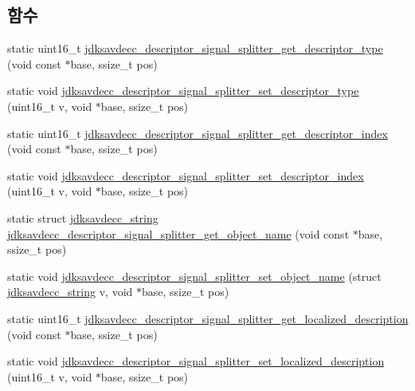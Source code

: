 \subsection*{함수}
\begin{DoxyCompactItemize}
\item 
static uint16\+\_\+t \hyperlink{group__descriptor__signal__splitter_ga2d820535595d7a1730629dc8cfe72a04}{jdksavdecc\+\_\+descriptor\+\_\+signal\+\_\+splitter\+\_\+get\+\_\+descriptor\+\_\+type} (void const $\ast$base, ssize\+\_\+t pos)
\item 
static void \hyperlink{group__descriptor__signal__splitter_ga26384b0bdf1407ece585e287f97437a7}{jdksavdecc\+\_\+descriptor\+\_\+signal\+\_\+splitter\+\_\+set\+\_\+descriptor\+\_\+type} (uint16\+\_\+t v, void $\ast$base, ssize\+\_\+t pos)
\item 
static uint16\+\_\+t \hyperlink{group__descriptor__signal__splitter_ga4fe9ee5536c672b456535486c30be9fa}{jdksavdecc\+\_\+descriptor\+\_\+signal\+\_\+splitter\+\_\+get\+\_\+descriptor\+\_\+index} (void const $\ast$base, ssize\+\_\+t pos)
\item 
static void \hyperlink{group__descriptor__signal__splitter_ga4171ef73e03044a469eda3e124ece880}{jdksavdecc\+\_\+descriptor\+\_\+signal\+\_\+splitter\+\_\+set\+\_\+descriptor\+\_\+index} (uint16\+\_\+t v, void $\ast$base, ssize\+\_\+t pos)
\item 
static struct \hyperlink{structjdksavdecc__string}{jdksavdecc\+\_\+string} \hyperlink{group__descriptor__signal__splitter_gac38a72dc2c8d33e642ee20458c317335}{jdksavdecc\+\_\+descriptor\+\_\+signal\+\_\+splitter\+\_\+get\+\_\+object\+\_\+name} (void const $\ast$base, ssize\+\_\+t pos)
\item 
static void \hyperlink{group__descriptor__signal__splitter_ga81033ad18000b6a2acb5a16ea11099ac}{jdksavdecc\+\_\+descriptor\+\_\+signal\+\_\+splitter\+\_\+set\+\_\+object\+\_\+name} (struct \hyperlink{structjdksavdecc__string}{jdksavdecc\+\_\+string} v, void $\ast$base, ssize\+\_\+t pos)
\item 
static uint16\+\_\+t \hyperlink{group__descriptor__signal__splitter_ga298db41e20729dde86f44a7c5db0d539}{jdksavdecc\+\_\+descriptor\+\_\+signal\+\_\+splitter\+\_\+get\+\_\+localized\+\_\+description} (void const $\ast$base, ssize\+\_\+t pos)
\item 
static void \hyperlink{group__descriptor__signal__splitter_gab3b491da6e8d0d8a641b1aed25685aa5}{jdksavdecc\+\_\+descriptor\+\_\+signal\+\_\+splitter\+\_\+set\+\_\+localized\+\_\+description} (uint16\+\_\+t v, void $\ast$base, ssize\+\_\+t pos)

\end{DoxyCompactItemize}
